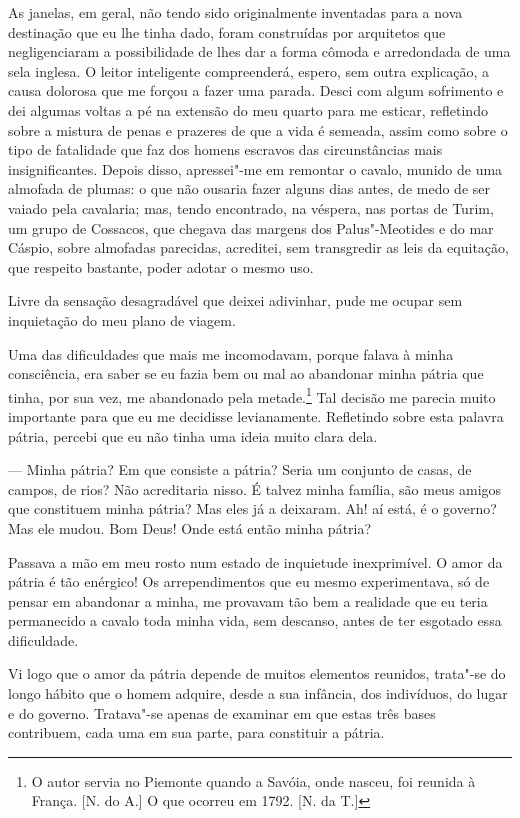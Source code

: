  As janelas, em geral, não tendo sido originalmente inventadas para a
nova destinação que eu lhe tinha dado, foram construídas por arquitetos
que negligenciaram a possibilidade de lhes dar a forma cômoda e
arredondada de uma sela inglesa. O leitor inteligente compreenderá,
espero, sem outra explicação, a causa dolorosa que me forçou a fazer
uma parada. Desci com algum sofrimento e dei algumas voltas a pé na
extensão do meu quarto para me esticar, refletindo sobre a mistura de
penas e prazeres de que a vida é semeada, assim como sobre o tipo de
fatalidade que faz dos homens escravos das circunstâncias mais
insignificantes. Depois disso, apressei"-me em remontar o cavalo, munido
de uma almofada de plumas: o que não ousaria fazer alguns dias antes,
de medo de ser vaiado pela cavalaria; mas, tendo encontrado, na
véspera, nas portas de Turim, um grupo de Cossacos, que chegava das
margens dos Palus"-Meotides e do mar Cáspio, sobre almofadas parecidas,
acreditei, sem transgredir as leis da equitação, que respeito bastante,
poder adotar o mesmo uso.

 Livre da sensação desagradável que deixei adivinhar, pude me ocupar sem
inquietação do meu plano de viagem.

 Uma das dificuldades que mais me incomodavam, porque falava à minha
consciência, era saber se eu fazia bem ou mal ao abandonar minha pátria
que tinha, por sua vez, me abandonado pela metade.\footnote{ O autor
servia no Piemonte quando a Savóia, onde nasceu, foi reunida à França.
[N. do A.] O que ocorreu em 1792. [N. da T.]} Tal decisão me parecia muito
importante para que eu me decidisse levianamente. Refletindo sobre esta
palavra pátria, percebi que eu não tinha uma ideia muito clara dela. 

--- Minha pátria? Em que consiste a pátria? Seria um conjunto de casas,
de campos, de rios? Não acreditaria nisso. É talvez minha família, são
meus amigos que constituem minha pátria? Mas eles já a deixaram. Ah! aí
está, é o governo? Mas ele mudou. Bom Deus! Onde está então minha
pátria?

 Passava a mão em meu rosto num estado de inquietude inexprimível. O
amor da pátria é tão enérgico! Os arrependimentos que eu mesmo
experimentava, só de pensar em abandonar a minha, me provavam tão bem a
realidade que eu teria permanecido a cavalo toda minha vida, sem
descanso, antes de ter esgotado essa dificuldade.

 Vi logo que o amor da pátria depende de muitos elementos reunidos,
trata"-se do longo hábito que o homem adquire, desde a sua infância, dos
indivíduos, do lugar e do governo. Tratava"-se apenas de examinar em que
estas três bases contribuem, cada uma em sua parte, para constituir a
pátria.

